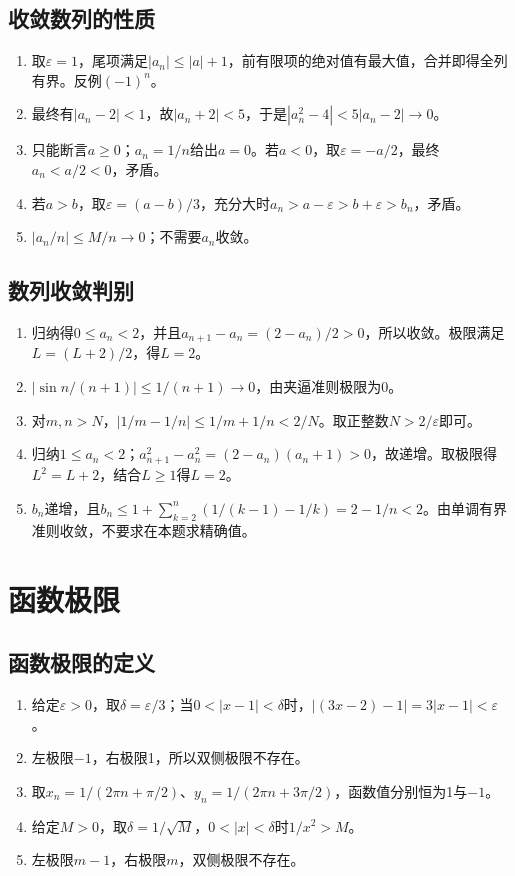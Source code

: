 \documentclass[11pt,a4paper,fontset=fandol]{ctexrep}
\begin{document}
\subsection{收敛数列的性质}
\begin{enumerate}
\item 取$\varepsilon=1$，尾项满足$|a_n|\le|a|+1$，前有限项的绝对值有最大值，合并即得全列有界。反例$(-1)^n$。
\item 最终有$|a_n-2|<1$，故$|a_n+2|<5$，于是$|a_n^2-4|<5|a_n-2|\to0$。
\item 只能断言$a\ge0$；$a_n=1/n$给出$a=0$。若$a<0$，取$\varepsilon=-a/2$，最终$a_n<a/2<0$，矛盾。
\item 若$a>b$，取$\varepsilon=(a-b)/3$，充分大时$a_n>a-\varepsilon>b+\varepsilon>b_n$，矛盾。
\item $|a_n/n|\le M/n\to0$；不需要$a_n$收敛。
\end{enumerate}
\subsection{数列收敛判别}
\begin{enumerate}
\item 归纳得$0\le a_n<2$，并且$a_{n+1}-a_n=(2-a_n)/2>0$，所以收敛。极限满足$L=(L+2)/2$，得$L=2$。
\item $|\sin n/(n+1)|\le1/(n+1)\to0$，由夹逼准则极限为0。
\item 对$m,n>N$，$|1/m-1/n|\le1/m+1/n<2/N$。取正整数$N>2/\varepsilon$即可。
\item 归纳$1\le a_n<2$；$a_{n+1}^2-a_n^2=(2-a_n)(a_n+1)>0$，故递增。取极限得$L^2=L+2$，结合$L\ge1$得$L=2$。
\item $b_n$递增，且$b_n\le1+\sum_{k=2}^n(1/(k-1)-1/k)=2-1/n<2$。由单调有界准则收敛，不要求在本题求精确值。
\end{enumerate}
\section{函数极限}
\subsection{函数极限的定义}
\begin{enumerate}
\item 给定$\varepsilon>0$，取$\delta=\varepsilon/3$；当$0<|x-1|<\delta$时，$|(3x-2)-1|=3|x-1|<\varepsilon$。
\item 左极限$-1$，右极限1，所以双侧极限不存在。
\item 取$x_n=1/(2\pi n+\pi/2)$、$y_n=1/(2\pi n+3\pi/2)$，函数值分别恒为1与$-1$。
\item 给定$M>0$，取$\delta=1/\sqrt M$，$0<|x|<\delta$时$1/x^2>M$。
\item 左极限$m-1$，右极限$m$，双侧极限不存在。
\end{enumerate}
\end{document}
